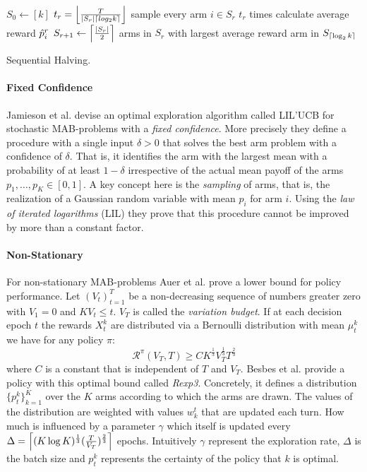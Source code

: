 \begin{algorithm}[ht]
\begin{algorithmic}
    \State $S_0 \gets [k]$
    \State $t_r = \floor*{\frac{T}{\left|S_r\right| \ceil*{log_2 k}}}$
    \State sample every arm $i \in S_r$ $t_r$ times
    \State calculate average reward $\Hat{p}_i^r$
    \State $S_{r+1} \gets \ceil*{\frac{\left| S_r \right|}{2}}$ arms in $S_r$ with largest average reward
    \EndFor
    \State \Return arm in $S_{\ceil*{\log_2 k}}$
\EndFunction
\end{algorithmic}
\caption{Sequential Halving.}
\label{alg:sequential_halving}
\end{algorithm}

\paragraph{Fixed Confidence}
Jamieson et al. \cite{jamieson2014lil} devise an optimal exploration algorithm called LIL'UCB for stochastic MAB-problems with a \textit{fixed confidence}. More precisely they define a procedure with a single input $\delta > 0$ that solves the best arm problem with a confidence of $\delta$. That is, it identifies the arm with the largest mean with a probability of at least $1-\delta$ irrespective of the actual mean payoff of the arms $p_1,\ldots,p_K \in [0,1]$. A key concept here is the \textit{sampling} of arms, that is, the realization of a Gaussian random variable with mean $p_i$ for arm $i$. Using the \textit{law of iterated logarithms} (LIL) they prove that this procedure cannot be improved by more than a constant factor.  
\paragraph{Non-Stationary} For non-stationary MAB-problems Auer et al. \cite{auer2002finite} prove a lower bound for policy performance. Let $(V_t)_{t=1}^{T}$ be a non-decreasing sequence of numbers greater zero with $V_1 = 0$ and $KV_t \leq t$. $V_T$ is called the \textit{variation budget}. If at each decision epoch $t$ the rewards $X_t^k$ are distributed via a Bernoulli distribution with mean $\mu_t^k$ we have for any policy $\pi$:
\begin{equation*}
    \mathcal{R}^\pi(V_T,T) \geq CK^{\frac{1}{3}}V_T^{\frac{1}{3}}T^{\frac{2}{3}}
\end{equation*} where $C$ is a constant that is independent of $T$ and $V_T$.
Besbes et al. \cite{besbes2019optimal} provide a policy with this optimal bound called \textit{Rexp3}. Concretely, it defines a distribution $\{p_t^k\}_{k=1}^K$ over the $K$ arms according to which the arms are drawn. The values of the distribution are weighted with values $w_k^t$ that are updated each turn. How much is influenced by a parameter $\gamma$ which itself is updated every $\Delta = \ceil*{(K \log K)^\frac{1}{3} (\frac{T}{V_T})^\frac{2}{3}}$ epochs. Intuitively $\gamma$ represent the exploration rate, $\Delta$ is the batch size and $p_t^k$ represents the certainty of the policy that $k$ is optimal. 

